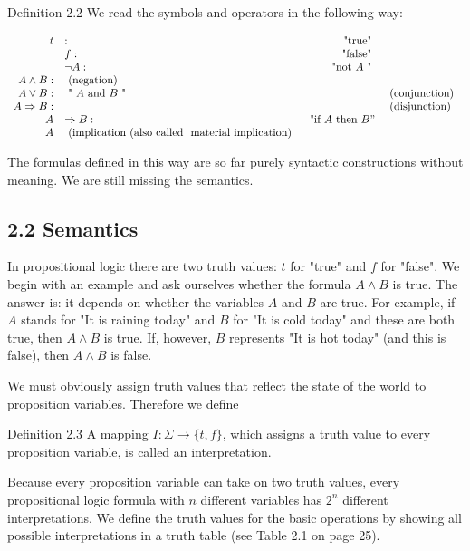 \documentclass[10pt]{article}
\begin{document}
Definition 2.2 We read the symbols and operators in the following way:

$$
\begin{array}{rlrl}
t & : & \text { "true" } & \\
& f: & \text { "false" } & \\
& \neg A: & \text { "not } A \text { " } & \\
A \wedge B: & \text { (negation) } \\
A \vee B: & \text { " } A \text { and } B \text { " } & & \text { (conjunction) } \\
A \Rightarrow B: & & & \text { (disjunction) } \\
A & \Rightarrow B: & \text { "if } A \text { then } B " & \\
A & \text { (implication (also called } \text { material implication) }
\end{array}
$$

The formulas defined in this way are so far purely syntactic constructions without meaning. We are still missing the semantics.

\subsection*{2.2 Semantics}
In propositional logic there are two truth values: $t$ for "true" and $f$ for "false". We begin with an example and ask ourselves whether the formula $A \wedge B$ is true. The answer is: it depends on whether the variables $A$ and $B$ are true. For example, if $A$ stands for "It is raining today" and $B$ for "It is cold today" and these are both true, then $A \wedge B$ is true. If, however, $B$ represents "It is hot today" (and this is false), then $A \wedge B$ is false.

We must obviously assign truth values that reflect the state of the world to proposition variables. Therefore we define

\begin{displayquote}
Definition 2.3 A mapping $I: \Sigma \rightarrow\{t, f\}$, which assigns a truth value to every proposition variable, is called an interpretation.
\end{displayquote}

Because every proposition variable can take on two truth values, every propositional logic formula with $n$ different variables has $2^{n}$ different interpretations. We define the truth values for the basic operations by showing all possible interpretations in a truth table (see Table 2.1 on page 25).
\end{document}
